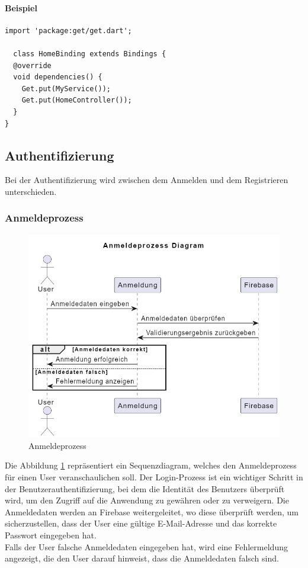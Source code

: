 \paragraph{Beispiel}
\begin{lstlisting}[caption=Beispiel von einem Binding,label=lst:GetxBindingExample]
  import 'package:get/get.dart';

  class HomeBinding extends Bindings {
  @override
  void dependencies() {
    Get.put(MyService());
    Get.put(HomeController());
  }
}

\end{lstlisting}

\subsection{Authentifizierung}

Bei der Authentifizierung wird zwischen dem Anmelden und dem Registrieren unterschieden.

\subsubsection{Anmeldeprozess}

\begin{figure}[h]
  \centering
  \includegraphics[width=\textwidth]{pics/login-sequence.JPG}
  \caption{Anmeldeprozess}
  \label{fig:login-sequenze}
\end{figure}

Die Abbildung \ref{fig:login-sequenze} repräsentiert ein Sequenzdiagram, welches den Anmeldeprozess für einen User veranschaulichen soll. Der Login-Prozess ist ein wichtiger Schritt in der Benutzerauthentifizierung, bei dem die Identität des Benutzers überprüft wird, um den Zugriff auf die Anwendung zu gewähren oder zu verweigern. Die Anmeldedaten werden an Firebase weitergeleitet, wo diese überprüft werden, um sicherzustellen, dass der User eine gültige E-Mail-Adresse und das korrekte Passwort eingegeben hat.
\\
Falls der User falsche Anmeldedaten eingegeben hat, wird eine Fehlermeldung angezeigt, die den User darauf hinweist, dass die Anmeldedaten falsch sind.

